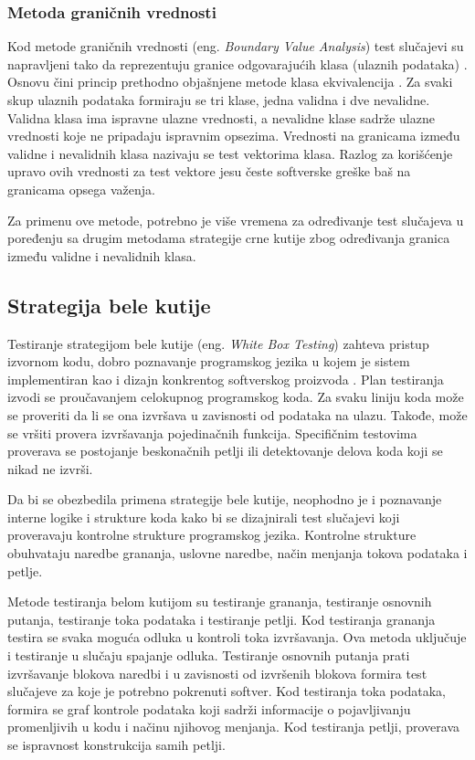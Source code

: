 \documentclass[12pt,oneside]{memoir}
\begin{document}
\subsubsection{Metoda graničnih vrednosti}
Kod metode graničnih  vrednosti (eng. \textit{Boundary Value  Analysis}) test slučajevi su
napravljeni  tako  da  reprezentuju  granice  odgovarajućih 
klasa (ulaznih podataka) . Osnovu čini princip prethodno objašnjene 
metode klasa ekvivalencija \cite{PartitioningBoundary}.
Za svaki skup ulaznih podataka formiraju se tri klase, jedna validna i dve nevalidne. Validna klasa ima ispravne ulazne vrednosti, a nevalidne klase sadrže ulazne vrednosti koje ne pripadaju ispravnim opsezima. Vrednosti na granicama između validne i nevalidnih klasa nazivaju se test vektorima klasa.
Razlog  za korišćenje upravo ovih vrednosti za test vektore jesu česte softverske greške baš na
granicama opsega važenja. 

Za primenu ove metode, potrebno je više vremena za određivanje test slučajeva u poređenju sa drugim metodama strategije crne kutije zbog određivanja granica između validne i nevalidnih klasa.

\subsection{Strategija bele kutije}
Testiranje strategijom bele kutije (eng. \textit{White Box Testing}) zahteva pristup izvornom kodu, dobro poznavanje programskog jezika u kojem je sistem implementiran kao i dizajn konkrentog softverskog proizvoda \cite{WhiteBoxTesting}. Plan testiranja izvodi se proučavanjem celokupnog programskog koda. Za svaku liniju koda može se proveriti da li se ona izvršava u zavisnosti od podataka na ulazu. Takođe, može se vršiti provera izvršavanja pojedinačnih funkcija. Specifičnim testovima proverava se postojanje beskonačnih petlji ili detektovanje delova koda koji se nikad ne izvrši. 
\par
Da bi se obezbedila primena strategije bele kutije, neophodno je i poznavanje interne logike i strukture koda kako bi se dizajnirali test slučajevi koji proveravaju kontrolne strukture programskog jezika. Kontrolne strukture obuhvataju naredbe grananja, uslovne naredbe, način menjanja tokova podataka i petlje.

Metode testiranja belom kutijom su testiranje grananja, testiranje osnovnih putanja, testiranje toka podataka i testiranje petlji.
Kod testiranja grananja testira se svaka moguća odluka u kontroli toka izvršavanja. Ova metoda uključuje i testiranje u slučaju spajanje odluka.  
Testiranje osnovnih putanja prati izvršavanje blokova naredbi i u zavisnosti od izvršenih blokova formira test slučajeve za koje je potrebno pokrenuti softver. Kod testiranja toka podataka, formira se graf kontrole podataka koji sadrži informacije o pojavljivanju promenljivih u kodu i načinu njihovog menjanja. Kod testiranja petlji, proverava se ispravnost konstrukcija samih petlji.
\end{document}
